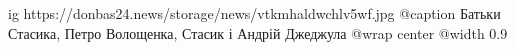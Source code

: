  
 
 
 
 

\ifcmt
  ig https://donbas24.news/storage/news/vtkmhaldwchlv5wf.jpg
	@caption Батьки Стасика, Петро Волощенка, Стасик і Андрій Джеджула
  @wrap center
  @width 0.9
\fi
